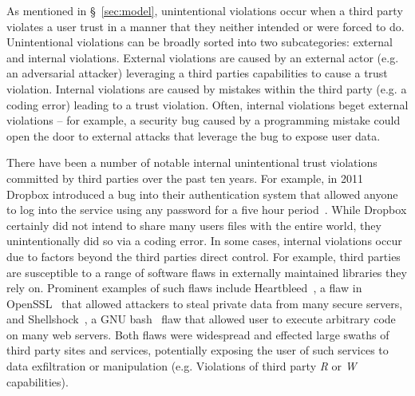 As mentioned in \S~\ref{sec:model}, unintentional violations occur
when a third party violates a user trust in a manner that they neither
intended or were forced to do. Unintentional violations can be broadly
sorted into two subcategories: external and internal
violations. External violations are caused by an external actor
(e.g. an adversarial attacker) leveraging a third parties capabilities
to cause a trust violation. Internal violations are caused by mistakes
within the third party (e.g. a coding error) leading to a trust
violation. Often, internal violations beget external violations -- for
example, a security bug caused by a programming mistake could open the
door to external attacks that leverage the bug to expose user data.

There have been a number of notable internal unintentional trust
violations committed by third parties over the past ten years. For
example, in 2011 Dropbox introduced a bug into their authentication
system that allowed anyone to log into the service using any password
for a five hour period~\cite{dropbox-authbug}. While Dropbox certainly
did not intend to share many users files with the entire world, they
unintentionally did so via a coding error. In some cases, internal
violations occur due to factors beyond the third parties direct
control. For example, third parties are susceptible to a range of
software flaws in externally maintained libraries they rely
on. Prominent examples of such flaws include
Heartbleed~\cite{heartbleed}, a flaw in OpenSSL~\cite{openssl} that
allowed attackers to steal private data from many secure servers, and
Shellshock~\cite{symantec-shellshock}, a GNU bash~\cite{gnu-bash} flaw
that allowed user to execute arbitrary code on many web servers. Both
flaws were widespread and effected large swaths of third party sites
and services, potentially exposing the user of such services to data
exfiltration or manipulation (e.g. Violations of third party \emph{R}
or \emph{W} capabilities).


